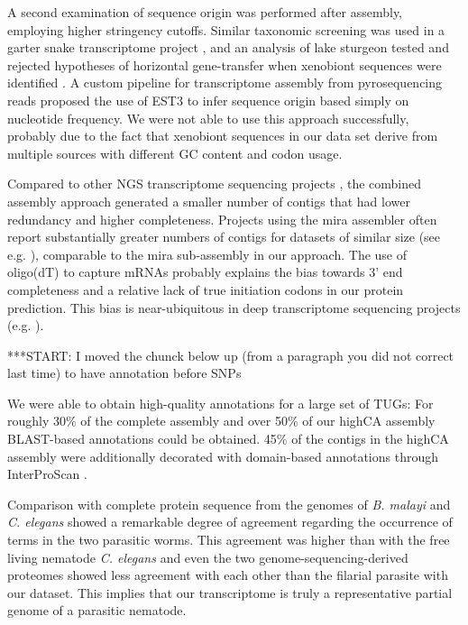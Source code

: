 \documentclass[10pt]{bmc_article}
\newenvironment{bmcformat}{\begin{raggedright}\baselineskip20pt\sloppy\setboolean{publ}{false}}{\end{raggedright}\baselineskip20pt\sloppy}
\begin{document}
\begin{bmcformat}
A second examination of sequence origin was performed after assembly,
employing higher stringency cutoffs.  Similar taxonomic screening was
used in a garter snake transcriptome project \cite{pmid21138572}, and
an analysis of lake sturgeon tested and rejected hypotheses of
horizontal gene-transfer when xenobiont sequences were identified
\cite{pmid20386959}. A custom pipeline for transcriptome assembly from
pyrosequencing reads \cite{pmid20034392} proposed the use of EST3
\cite{pmid17218127} to infer sequence origin based simply on
nucleotide frequency. We were not able to use this approach
successfully, probably due to the fact that xenobiont sequences in our
data set derive from multiple sources with different GC content and
codon usage.

Compared to other NGS transcriptome sequencing projects
\cite{pmid20478048}, the combined assembly approach generated a
smaller number of contigs that had lower redundancy and higher
completeness. Projects using the mira assembler often report
substantially greater numbers of contigs for datasets of similar size
(see e.g. \cite{pmid21364769}), comparable to the mira sub-assembly in
our approach. The use of oligo(dT) to capture mRNAs probably explains
the bias towards 3' end completeness and a relative lack of true
initiation codons in our protein prediction. This bias is
near-ubiquitous in deep transcriptome sequencing projects
(e.g. \cite{pmid20331785}).

***START: I moved the chunck below up (from a paragraph you did not
correct last time) to have annotation before SNPs

We were able to obtain high-quality annotations for a large set of
TUGs: For roughly 30\% of the complete assembly and over 50\% of our
highCA assembly BLAST-based annotations could be obtained. 45\% of the
contigs in the highCA assembly were additionally decorated with
domain-based annotations through InterProScan \cite{pmid11590104}.

Comparison with complete protein sequence from the genomes of
\textit{B. malayi} and \textit{C. elegans} showed a remarkable degree
of agreement regarding the occurrence of terms in the two parasitic
worms. This agreement was higher than with the free living nematode
\textit{C. elegans} and even the two genome-sequencing-derived
proteomes showed less agreement with each other than the filarial
parasite with our dataset. This implies that our transcriptome is
truly a representative partial genome
\cite{parkinson_partigene--constructing_2004} of a parasitic nematode.


\end{bmcformat}
\end{document}
